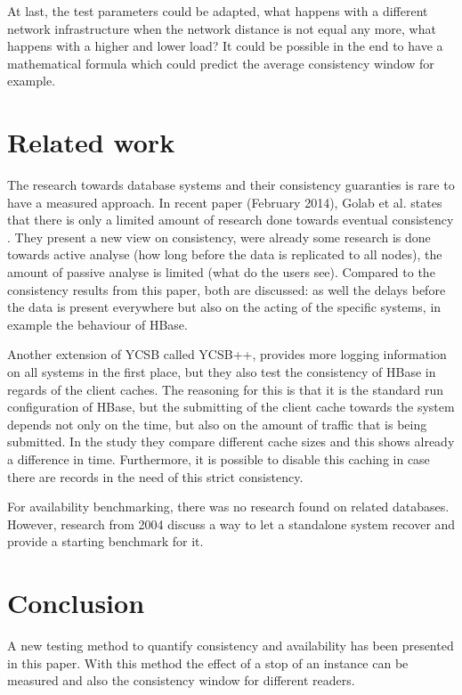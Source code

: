 \documentclass[final,5p,times]{elsarticle}
\begin{document}
At last, the test parameters could be adapted, what happens with a different network infrastructure when the network distance is not equal any more, what happens with a higher and lower load? It could be possible in the end to have a mathematical formula which could predict the average consistency window for example.  


\section{Related work}\label{sec:related work}
The research towards database systems and their consistency guaranties is rare to have a measured approach. In recent paper (February 2014), Golab et al. states that there is only a limited amount of research done towards eventual consistency \cite{golab2014eventually}. They present a new view on consistency, were already some research is done towards active analyse (how long before the data is replicated to all nodes), the amount of passive analyse is limited (what do the users see). Compared to the consistency results from this paper, both are discussed: as well the delays before the data is present everywhere but also on the acting of the specific systems, in example the behaviour of HBase. 

Another extension of YCSB called YCSB++\cite{patil2011ycsb++}, provides more logging information on all systems in the first place, but they also test the consistency of HBase in regards of the client caches. The reasoning for this is that it is the standard run configuration of HBase, but the submitting of the client cache towards the system depends not only on the time, but also on the amount of traffic that is being submitted. In the study they compare different cache sizes and this shows already a difference in time. Furthermore, it is possible to disable this caching in case there are records in the need of this strict consistency. 

For availability benchmarking, there was no research found on related databases. However, research from 2004 \cite{mauro2004system} discuss a way to let a standalone system recover and provide a starting benchmark for it.  


\section{Conclusion}\label{sec:conclusion}
A new testing method to quantify consistency and availability has been presented in this paper. With this method the effect of a stop of an instance can be measured and also the consistency window for different readers. 
\end{document}
